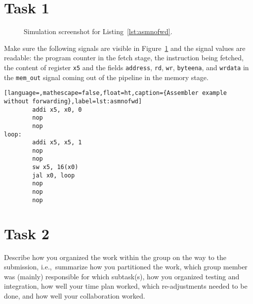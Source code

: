 \documentclass[11pt,a4paper,titlepage,oneside]{article}
\begin{document}
\maketitle

\section*{Task 1}

\begin{figure}[ht!]
  \centering
  \caption{Simulation screenshot for Listing~\ref{lst:asmnofwd}.}
  \label{fig:sim}
\end{figure}

Make sure the following signals are visible in Figure~\ref{fig:sim} and the 
signal values are readable:
the program counter in the fetch stage, the instruction being fetched, the 
content of register \texttt{x5} and the fields \texttt{address}, \texttt{rd}, 
\texttt{wr}, \texttt{byteena}, and \texttt{wrdata} in the \texttt{mem\_out} 
signal coming out of the pipeline in the memory stage.

\begin{lstlisting}[language=,mathescape=false,float=ht,caption={Assembler example without forwarding},label=lst:asmnofwd]
        addi x5, x0, 0
        nop
        nop
loop:
        addi x5, x5, 1
        nop
        nop
        sw x5, 16(x0)
        jal x0, loop
        nop
        nop
        nop
\end{lstlisting}


\clearpage

\section*{Task 2}
Describe how you organized the work within the group on the way to the 
submission, i.e.,~summarize how you partitioned the work, which group 
member was (mainly) responsible for which subtask(s), how you organized 
testing and integration, how well your time plan worked, which 
re-adjustments needed to be done, and how well your collaboration 
worked.
\end{document}
